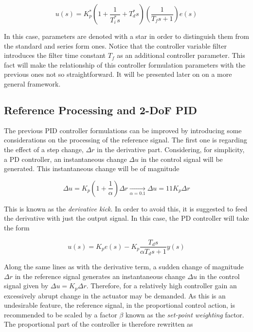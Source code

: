 \begin{itemize}
\begin{equation}
	u(s) =  K^*_p \left(1+ \frac{1}{T^*_i s} + T^*_d s  \right) \left(\frac{1}{T_f s+1}\right) e(s)	
\end{equation} 

In this case, parameters are denoted with a star in order to distinguish them from the standard and series form ones. Notice that the controller variable filter introduces the filter time constant $T_f$ as an additional controller parameter. This fact will make the relationship of this controller formulation parameters with the previous ones not so straightforward. It will be presented later on on a more general framework. 
\end{itemize}



\subsection{Reference Processing and 2-DoF PID}
\label{sec:3.2}

The previous PID controller formulations can be improved by introducing some considerations on the processing of the reference signal. The first one is regarding the effect of a step change, $\Delta r$ in the derivative part. Considering, for simplicity, a PD controller, an instantaneous change $\Delta u$ in the control signal will be generated. This instantaneous change will be of magnitude

\begin{equation}
\Delta u = K_p \left ( 1 +\frac{1}{\alpha} \right ) \Delta r \xrightarrow[\alpha=0.1]{}\Delta u = 11 K_p \Delta r
\end{equation} 

This is known as the \emph{derivative kick}. In order to avoid this, it is suggested to feed the derivative with just the output signal.  In this case, the PD controller will take the form

\begin{equation}
u(s)=K_p e(s) - K_p\frac{T_ds}{\alpha T_d s+1} y(s)
\end{equation}

Along the same lines as with the derivative term, a sudden change of magnitude $\Delta r$ in the reference signal generates an instantaneous change $\Delta u$ in the control signal given by $\Delta u = K_p \Delta r$. Therefore, for a relatively high controller gain an excessively abrupt change in the actuator may be demanded. As this is an undesirable feature, the reference signal, in the proportional control action, is recommended to be scaled by a factor $\beta$ known as the \emph{set-point weighting} factor.  The proportional part of the controller is therefore rewritten as

